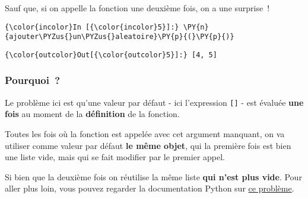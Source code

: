     Sauf que, si on appelle la fonction une deuxième fois, on a une
surprise~!

    \begin{Verbatim}[commandchars=\\\{\}]
{\color{incolor}In [{\color{incolor}5}]:} \PY{n}{ajouter\PYZus{}un\PYZus{}aleatoire}\PY{p}{(}\PY{p}{)}
\end{Verbatim}


\begin{Verbatim}[commandchars=\\\{\}]
{\color{outcolor}Out[{\color{outcolor}5}]:} [4, 5]
\end{Verbatim}
            
    \hypertarget{pourquoi}{%
\subsubsection{Pourquoi~?}\label{pourquoi}}

    Le problème ici est qu'une valeur par défaut - ici l'expression
\texttt{{[}{]}} - est évaluée \textbf{une fois} au moment de la
\textbf{définition} de la fonction.

Toutes les fois où la fonction est appelée avec cet argument manquant,
on va utiliser comme valeur par défaut \textbf{le même objet}, qui la
première fois est bien une liste vide, mais qui se fait modifier par le
premier appel.

Si bien que la deuxième fois on réutilise la même liste \textbf{qui
n'est plus vide}. Pour aller plus loin, vous pouvez regarder la
documentation Python sur
\href{https://docs.python.org/3/faq/programming.html\#why-are-default-values-shared-between-objects}{ce
problème}.


    
    
    
